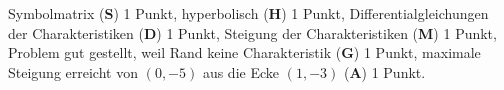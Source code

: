 \begin{bewertung}
Symbolmatrix ({\bf S}) 1 Punkt,
hyperbolisch ({\bf H}) 1 Punkt,
Differentialgleichungen der Charakteristiken ({\bf D}) 1 Punkt,
Steigung der Charakteristiken ({\bf M}) 1 Punkt,
Problem gut gestellt, weil Rand keine Charakteristik ({\bf G}) 1 Punkt,
maximale Steigung erreicht von $(0,-5)$ aus die Ecke $(1,-3)$ ({\bf A})
1 Punkt.
\end{bewertung}
